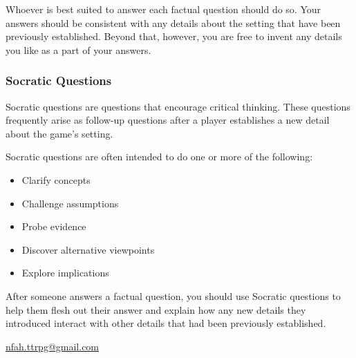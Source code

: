 \documentclass[a6paper, 11pt, parskip=half, DIV=15]{scrartcl}
\begin{document}
\vfill

Whoever is best suited to answer each factual question should do so.
Your answers should be consistent with any details about the setting that have been previously established.
Beyond that, however, you are free to invent any details you like as a part of your answers.

\newpage
\enlargethispage{1.75\baselineskip}

\subsubsection*{Socratic Questions}
Socratic questions are questions that encourage critical thinking.
These questions frequently arise as follow-up questions after a player establishes a new detail about the game's setting.

Socratic questions are often intended to do one or more of the following:%
\begin{itemize}[nosep]
	\item Clarify concepts
	\item Challenge assumptions
	\item Probe evidence
	\item Discover alternative viewpoints
	\item Explore implications
\end{itemize}

After someone answers a factual question, you should use Socratic questions to help them flesh out their answer and explain how any new details they introduced interact with other details that had been previously established.


\vfill

\hrulefill
\begin{description}[nosep]
\item[\textbf{Contact}:] \href{mailto:nfah.ttrpg@gmail.com}{nfah.ttrpg@gmail.com}\\
\item[\textbf{License}:] \doclicenseText%
\end{description}
\end{document}
